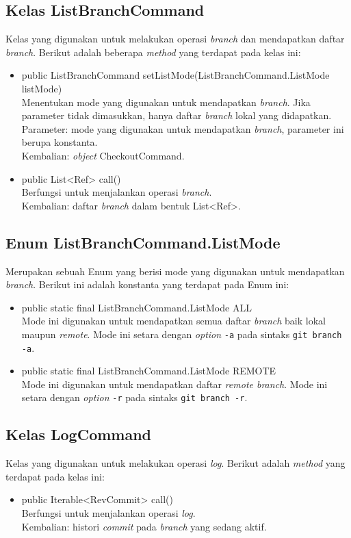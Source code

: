 \subsection{Kelas ListBranchCommand}
\label{subsec:listbranchcommand}
Kelas yang digunakan untuk melakukan operasi \textit{branch} dan mendapatkan daftar \textit{branch}.
Berikut adalah beberapa \textit{method} yang terdapat pada kelas ini:
\begin{itemize}
\item public ListBranchCommand setListMode(ListBranchCommand.ListMode listMode)\\
Menentukan mode yang digunakan untuk mendapatkan \textit{branch}. Jika parameter tidak dimasukkan, hanya daftar \textit{branch} lokal yang didapatkan.\\
Parameter: mode yang digunakan untuk mendapatkan \textit{branch}, parameter ini berupa konstanta.\\
Kembalian: \textit{object} CheckoutCommand.
\item public List<Ref> call()\\
Berfungsi untuk menjalankan operasi \textit{branch}.\\
Kembalian: daftar \textit{branch} dalam bentuk List<Ref>.
\end{itemize}

\subsection{Enum ListBranchCommand.ListMode}
Merupakan sebuah Enum yang berisi mode yang digunakan untuk mendapatkan \textit{branch}.
Berikut ini adalah konstanta yang terdapat pada Enum ini:
\begin{itemize}
\item public static final ListBranchCommand.ListMode ALL\\
Mode ini digunakan untuk mendapatkan semua daftar \textit{branch} baik lokal maupun \textit{remote}. Mode ini setara dengan \textit{option} \texttt{-a} pada sintaks \texttt{git branch -a}.
\item public static final ListBranchCommand.ListMode REMOTE\\
Mode ini digunakan untuk mendapatkan daftar \textit{remote branch}. Mode ini setara dengan \textit{option} \texttt{-r} pada sintaks \texttt{git branch -r}. 
\end{itemize}


\subsection{Kelas LogCommand}
\label{subsec:logcommand}
Kelas yang digunakan untuk melakukan operasi \textit{log}.
Berikut adalah \textit{method} yang terdapat pada kelas ini:
\begin{itemize}
\item public Iterable<RevCommit> call()\\
Berfungsi untuk menjalankan operasi \textit{log}.\\
Kembalian: histori \textit{commit} pada \textit{branch} yang sedang aktif. 
\end{itemize}

